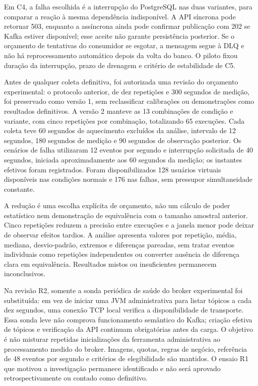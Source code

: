 Em C4, a falha escolhida é a interrupção do PostgreSQL nas duas variantes, para comparar a reação à mesma dependência indisponível. A API síncrona pode retornar 503, enquanto a assíncrona ainda pode confirmar publicação com 202 se Kafka estiver disponível; esse aceite não garante persistência posterior. Se o orçamento de tentativas do consumidor se esgotar, a mensagem segue à DLQ e não há reprocessamento automático depois da volta do banco. O piloto fixou duração da interrupção, prazo de drenagem e critério de estabilidade de C5.

Antes de qualquer coleta definitiva, foi autorizada uma revisão do orçamento experimental: o protocolo anterior, de dez repetições e 300 segundos de medição, foi preservado como versão 1, sem reclassificar calibrações ou demonstrações como resultados definitivos. A versão 2 manteve as 13 combinações de condição e variante, com cinco repetições por combinação, totalizando 65 execuções. Cada coleta teve 60 segundos de aquecimento excluídos da análise, intervalo de 12 segundos, 180 segundos de medição e 90 segundos de observação posterior. Os cenários de falha utilizaram 12 eventos por segundo e interrupção solicitada de 40 segundos, iniciada aproximadamente aos 60 segundos da medição; os instantes efetivos foram registrados. Foram disponibilizados 128 usuários virtuais disponíveis nas condições normais e 176 nas falhas, sem pressupor simultaneidade constante.

A redução é uma escolha explícita de orçamento, não um cálculo de poder estatístico nem demonstração de equivalência com o tamanho amostral anterior. Cinco repetições reduzem a precisão entre execuções e a janela menor pode deixar de observar efeitos tardios. A análise apresenta valores por repetição, média, mediana, desvio-padrão, extremos e diferenças pareadas, sem tratar eventos individuais como repetições independentes ou converter ausência de diferença clara em equivalência. Resultados mistos ou insuficientes permanecem inconclusivos.

Na revisão R2, somente a sonda periódica de saúde do broker experimental foi substituída: em vez de iniciar uma JVM administrativa para listar tópicos a cada dez segundos, uma conexão TCP local verifica a disponibilidade de transporte. Essa sonda leve não comprova funcionamento semântico do Kafka; criação efetiva de tópicos e verificação da API continuam obrigatórias antes da carga. O objetivo é não misturar repetidas inicializações da ferramenta administrativa ao processamento medido do broker. Imagens, quotas, regras de negócio, referência de 48 eventos por segundo e critérios de elegibilidade são mantidos. O ensaio R1 que motivou a investigação permanece identificado e não será aprovado retrospectivamente ou contado como definitivo.

